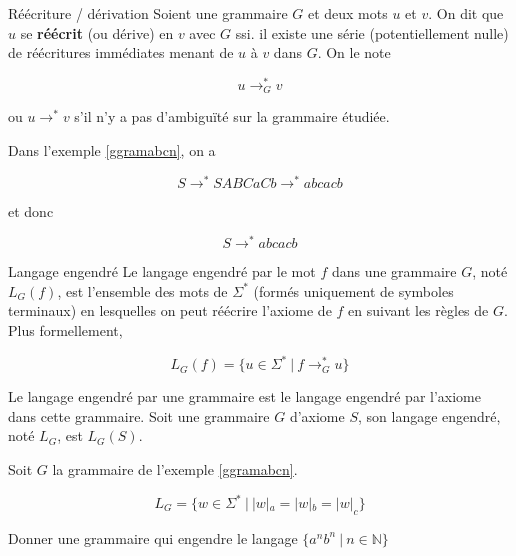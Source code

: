\begin{definition}{Réécriture / dérivation}{}
Soient une grammaire $G$ et deux mots $u$ et $v$. On dit que $u$ se \textbf{réécrit} (ou dérive) en $v$ avec $G$ ssi. il existe une série (potentiellement nulle) de réécritures immédiates menant de $u$ à $v$ dans $G$. On le note 

\[
u \rightarrow_G^* v
\]

ou $u \rightarrow^* v$ s'il n'y a pas d'ambiguïté sur la grammaire étudiée.

\end{definition}
 
\begin{example}
Dans l'exemple \ref{ggramabcn}, on a 

\[
S \rightarrow^* SABCaCb \rightarrow^* abcacb
\]

et donc 

\[
S \rightarrow^* abcacb
\]
\end{example}
 

\begin{definition}{Langage engendré}{}
Le langage engendré par le mot $f$ dans une grammaire $G$, noté $L_G(f)$, est l'ensemble des mots de $\Sigma^*$ (formés uniquement de symboles terminaux) en lesquelles on peut réécrire l'axiome de $f$ en suivant les règles de $G$. Plus formellement,

\[
L_G(f) = \{u \in \Sigma^* ~|~f \rightarrow_G^* u\}
\]

Le langage engendré par une grammaire est le langage engendré par l'axiome dans cette grammaire. Soit une grammaire $G$ d'axiome $S$, son langage engendré, noté $L_G$, est $L_G(S)$.
\end{definition}

\begin{example}
Soit $G$ la grammaire de l'exemple \ref{ggramabcn}. 

\[
L_G = \{w \in \Sigma^* ~|~|w|_a = |w|_b = |w|_c \}
\]
\end{example}


\begin{exercice}
Donner une grammaire qui engendre le langage $\{a^nb^n ~|~ n \in \mathbb{N}\}$
\end{exercice}

